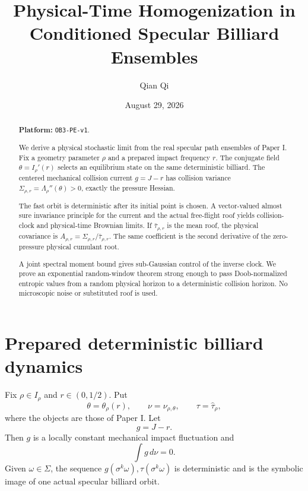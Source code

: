 \documentclass[11pt,reqno]{amsart}
\title[Physical-time specular homogenization]{Physical-Time Homogenization in Conditioned Specular Billiard Ensembles}
\author{Qian Qi}
\date{August 29, 2026}
\theoremstyle{definition}
\theoremstyle{remark}
\begin{document}
\raggedbottom
\begin{abstract}
\noindent\textbf{Platform: }\texttt{OB3-PE-v1}.\par
We derive a physical stochastic limit from the real specular path ensembles of
Paper I.  Fix a geometry parameter $\rho$ and a prepared impact frequency
$r$.  The conjugate field $\theta=I_\rho'(r)$ selects an equilibrium state on
the same deterministic billiard.  The centered mechanical collision current
$g=J-r$ has collision variance
$\Sigma_{\rho,r}=\Lambda_\rho''(\theta)>0$, exactly the pressure Hessian.

The fast orbit is deterministic after its initial point is chosen.  A
vector-valued almost sure invariance principle for the current and the actual
free-flight roof yields collision-clock and physical-time Brownian limits.  If
$\bar\tau_{\rho,r}$ is the mean roof, the physical covariance is
$A_{\rho,r}=\Sigma_{\rho,r}/\bar\tau_{\rho,r}$.  The same coefficient is the
second derivative of the zero-pressure physical cumulant root.

A joint spectral moment bound gives sub-Gaussian control of the inverse clock.
We prove an exponential random-window theorem strong enough to pass
Doob-normalized entropic values from a random physical horizon to a
deterministic collision horizon.  No microscopic noise or substituted roof is
used.
\end{abstract}
\maketitle
\tableofcontents

\section{Prepared deterministic billiard dynamics}\label{sec:prepared}
Fix $\rho\in I_\rho$ and $r\in(0,1/2)$.  Put
\[
 \theta=\theta_\rho(r),\qquad
 \nu=\nu_{\rho,\theta},\qquad
 \tau=\widehat\tau_\rho,
\]
where the objects are those of Paper I.  Let
\[
 g=J-r.
\]
Then $g$ is a locally constant mechanical impact fluctuation and
\[
 \int g\,d\nu=0.
\]
Given $\omega\in\Sigma$, the sequence
$g(\sigma^k\omega),\tau(\sigma^k\omega)$ is deterministic and is the symbolic
image of one actual specular billiard orbit.
\end{document}
